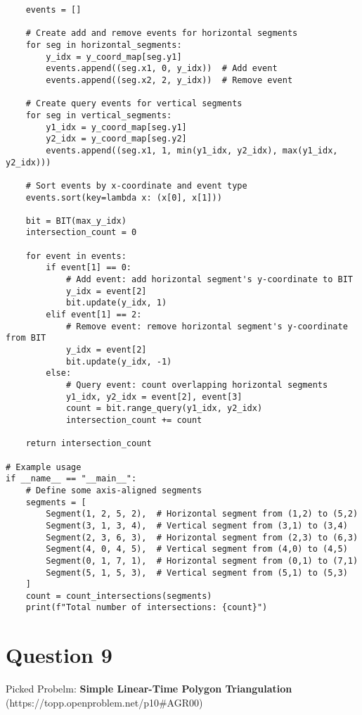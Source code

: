 \documentclass{article}
\begin{document}
\begin{verbatim}
    events = []

    # Create add and remove events for horizontal segments
    for seg in horizontal_segments:
        y_idx = y_coord_map[seg.y1]
        events.append((seg.x1, 0, y_idx))  # Add event
        events.append((seg.x2, 2, y_idx))  # Remove event

    # Create query events for vertical segments
    for seg in vertical_segments:
        y1_idx = y_coord_map[seg.y1]
        y2_idx = y_coord_map[seg.y2]
        events.append((seg.x1, 1, min(y1_idx, y2_idx), max(y1_idx, y2_idx)))

    # Sort events by x-coordinate and event type
    events.sort(key=lambda x: (x[0], x[1]))

    bit = BIT(max_y_idx)
    intersection_count = 0

    for event in events:
        if event[1] == 0:
            # Add event: add horizontal segment's y-coordinate to BIT
            y_idx = event[2]
            bit.update(y_idx, 1)
        elif event[1] == 2:
            # Remove event: remove horizontal segment's y-coordinate from BIT
            y_idx = event[2]
            bit.update(y_idx, -1)
        else:
            # Query event: count overlapping horizontal segments
            y1_idx, y2_idx = event[2], event[3]
            count = bit.range_query(y1_idx, y2_idx)
            intersection_count += count

    return intersection_count

# Example usage
if __name__ == "__main__":
    # Define some axis-aligned segments
    segments = [
        Segment(1, 2, 5, 2),  # Horizontal segment from (1,2) to (5,2)
        Segment(3, 1, 3, 4),  # Vertical segment from (3,1) to (3,4)
        Segment(2, 3, 6, 3),  # Horizontal segment from (2,3) to (6,3)
        Segment(4, 0, 4, 5),  # Vertical segment from (4,0) to (4,5)
        Segment(0, 1, 7, 1),  # Horizontal segment from (0,1) to (7,1)
        Segment(5, 1, 5, 3),  # Vertical segment from (5,1) to (5,3)
    ]
    count = count_intersections(segments)
    print(f"Total number of intersections: {count}")
\end{verbatim}

\newpage

\section*{Question 9}
Picked Probelm: \textbf{Simple Linear-Time Polygon Triangulation} 
\\
(https://topp.openproblem.net/p10#AGR00)
\\
\end{document}
